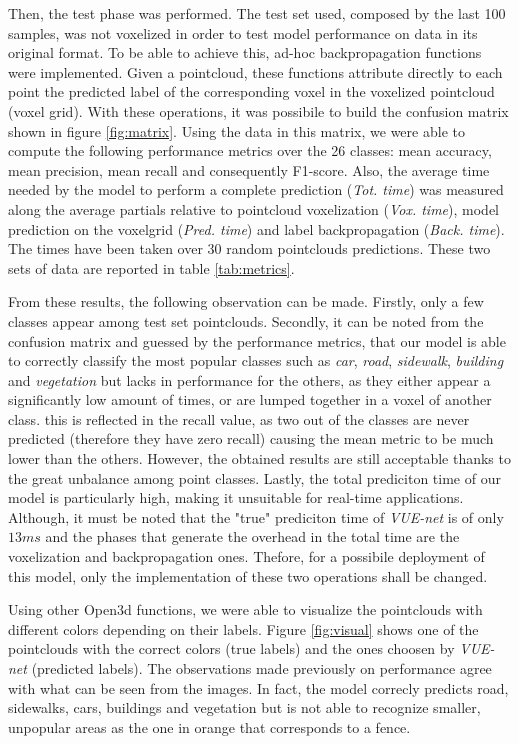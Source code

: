 Then, the test phase was performed. The test set used, composed by the last 100 samples, 
was not voxelized in order to test model performance on data in its original format.
To be able to achieve this, ad-hoc backpropagation functions were implemented.
Given a pointcloud, these functions attribute directly to each point the predicted label of the
corresponding voxel in the voxelized pointcloud (voxel grid).
With these operations, it was possibile to build the confusion matrix shown in figure \ref{fig:matrix}.
Using the data in this matrix, we were able to compute the following performance metrics over the 26 classes: 
mean accuracy, mean precision, mean recall and consequently F1-score.
Also, the average time needed by the model to perform a complete prediction (\textit{Tot. time}) was measured along the average partials relative to
pointcloud voxelization (\textit{Vox. time}), model prediction on the voxelgrid (\textit{Pred. time}) and
label backpropagation (\textit{Back. time}). The times have been taken over 30 random pointclouds predictions.
These two sets of data are reported in table \ref{tab:metrics}.

From these results, the following observation can be made.
Firstly, only a few classes appear among test set pointclouds.
Secondly, it can be noted from the confusion matrix and guessed by the performance metrics, 
that our model is able to correctly classify the most popular classes such as \textit{car},
\textit{road}, \textit{sidewalk}, \textit{building} and \textit{vegetation} 
but lacks in performance for the others, as they either appear a significantly low amount of times, or are lumped together in a voxel of another class. this is reflected in the recall value, as two out of the
classes are never predicted (therefore they have zero recall) causing the mean metric to be much lower than the others.
However, the obtained results are still acceptable thanks to the great unbalance among point classes.
Lastly, the total prediciton time of our model is particularly high,
making it unsuitable for real-time applications. Although, it must be noted that the "true" prediciton time
of \textit{VUE-net} is of only $13ms$ and the phases that generate the overhead in the total time
are the voxelization and backpropagation ones. Thefore, for a possibile deployment of this model, only the 
implementation of these two operations shall be changed.

Using other Open3d functions, we were able to visualize the pointclouds with different colors depending
on their labels. Figure \ref{fig:visual} shows one of the pointclouds with the
correct colors (true labels) and the ones choosen by \textit{VUE-net} (predicted labels).
The observations made previously on performance agree with what can be seen from the images.
In fact, the model correcly predicts road, sidewalks, cars, buildings and vegetation but is not
able to recognize smaller, unpopular areas as the one in orange that corresponds to a fence.
